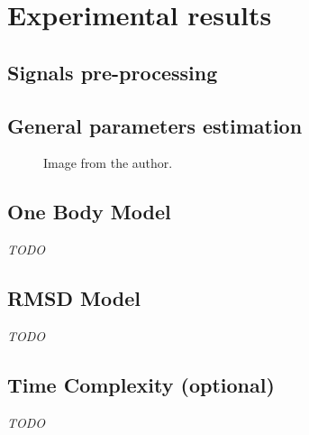\documentclass[/home/francois/latex/report/main.tex]{subfiles}
\begin{document}
\chapter{Experimental results}
\label{chapter:results}

\section{Signals pre-processing}
\label{section:pre-processing}


\section{General parameters estimation}
\label{section:results-general-parameters}


\begin{figure}[H]
  \centering
  \caption{ Image from the author.}
  \label{fig:results:torque_}
\end{figure}

\section{One Body Model}

\textit{TODO}

\section{RMSD Model}

\textit{TODO}

\section{Time Complexity (optional)}

\textit{TODO}
\end{document}
